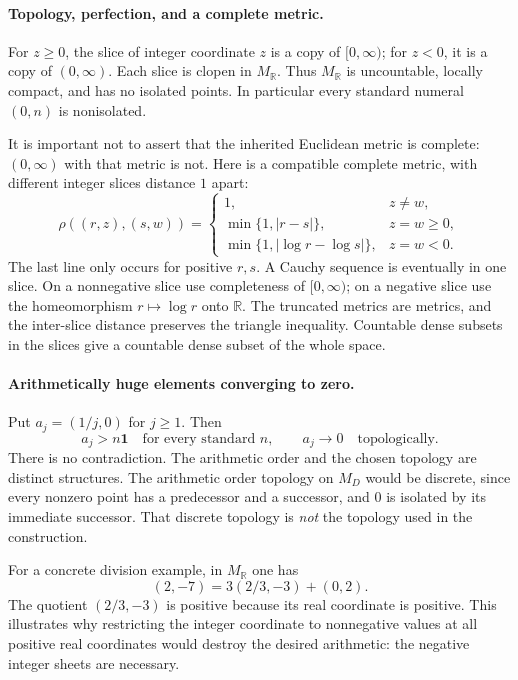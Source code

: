 \documentclass[11pt]{article}
\numberwithin{equation}{section}
\theoremstyle{definition}
\theoremstyle{remark}
\newcommand{\R}{\mathbb R}
\newcommand{\MR}{M_{\R}}
\newcommand{\one}{\mathbf 1}
\begin{document}
\paragraph{Topology, perfection, and a complete metric.}

For $z\geq0$, the slice of integer coordinate $z$ is a copy of
$[0,\infty)$; for $z<0$, it is a copy of $(0,\infty)$. Each slice is clopen
in $\MR$. Thus $\MR$ is uncountable, locally compact, and has no isolated
points. In particular every standard numeral $(0,n)$ is nonisolated.

It is important not to assert that the inherited Euclidean metric is
complete: $(0,\infty)$ with that metric is not. Here is a compatible
complete metric, with different integer slices distance $1$ apart:
\begin{equation}\label{pma:pr:eq:realmetric}
 \rho((r,z),(s,w))=
 \begin{cases}
 1,&z\ne w,\\
 \min\{1,|r-s|\},&z=w\geq0,\\
 \min\{1,|\log r-\log s|\},&z=w<0.
 \end{cases}
\end{equation}
The last line only occurs for positive $r,s$. A Cauchy sequence is eventually
in one slice. On a nonnegative slice use completeness of $[0,\infty)$;
on a negative slice use the homeomorphism $r\mapsto\log r$ onto $\R$.
The truncated metrics are metrics, and the inter-slice distance preserves
the triangle inequality. Countable dense subsets in the slices give a
countable dense subset of the whole space.

\paragraph{Arithmetically huge elements converging to zero.}

Put $a_j=(1/j,0)$ for $j\geq1$. Then
\[
 a_j>n\one\quad\text{for every standard }n,
 \qquad a_j\longrightarrow0\quad\text{topologically}.
\]
There is no contradiction. The arithmetic order and the chosen topology
are distinct structures. The arithmetic order topology on $M_D$ would
be discrete, since every nonzero point has a predecessor and a successor,
and $0$ is isolated by its immediate successor. That discrete topology is
\emph{not} the topology used in the construction.

For a concrete division example, in $\MR$ one has
\[
 (2,-7)=3(2/3,-3)+(0,2).
\]
The quotient $(2/3,-3)$ is positive because its real coordinate is positive.
This illustrates why restricting the integer coordinate to nonnegative
values at all positive real coordinates would destroy the desired
arithmetic: the negative integer sheets are necessary.
\end{document}
